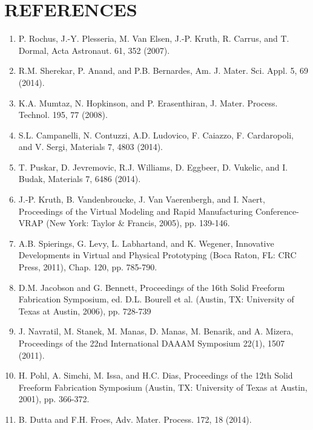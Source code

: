 \documentclass[10pt]{article}
\begin{document}
\section*{REFERENCES}
\begin{enumerate}
  \item P. Rochus, J.-Y. Plesseria, M. Van Elsen, J.-P. Kruth, R. Carrus, and T. Dormal, Acta Astronaut. 61, 352 (2007).

  \item R.M. Sherekar, P. Anand, and P.B. Bernardes, Am. J. Mater. Sci. Appl. 5, 69 (2014).

  \item K.A. Mumtaz, N. Hopkinson, and P. Erasenthiran, J. Mater. Process. Technol. 195, 77 (2008).

  \item S.L. Campanelli, N. Contuzzi, A.D. Ludovico, F. Caiazzo, F. Cardaropoli, and V. Sergi, Materials 7, 4803 (2014).

  \item T. Puskar, D. Jevremovic, R.J. Williams, D. Eggbeer, D. Vukelic, and I. Budak, Materials 7, 6486 (2014).

  \item J.-P. Kruth, B. Vandenbroucke, J. Van Vaerenbergh, and I. Naert, Proceedings of the Virtual Modeling and Rapid Manufacturing Conference-VRAP (New York: Taylor \& Francis, 2005), pp. 139-146.

  \item A.B. Spierings, G. Levy, L. Labhartand, and K. Wegener, Innovative Developments in Virtual and Physical Prototyping (Boca Raton, FL: CRC Press, 2011), Chap. 120, pp. 785-790.

  \item D.M. Jacobson and G. Bennett, Proceedings of the 16th Solid Freeform Fabrication Symposium, ed. D.L. Bourell et al. (Austin, TX: University of Texas at Austin, 2006), pp. 728-739

  \item J. Navratil, M. Stanek, M. Manas, D. Manas, M. Benarik, and A. Mizera, Proceedings of the 22nd International DAAAM Symposium 22(1), 1507 (2011).

  \item H. Pohl, A. Simchi, M. Issa, and H.C. Dias, Proceedings of the 12th Solid Freeform Fabrication Symposium (Austin, TX: University of Texas at Austin, 2001), pp. 366-372.

  \item B. Dutta and F.H. Froes, Adv. Mater. Process. 172, 18 (2014).


\end{enumerate}
\end{document}
